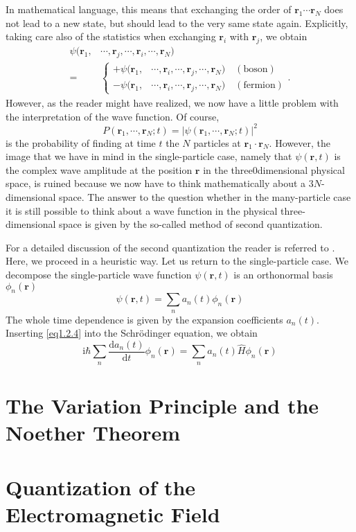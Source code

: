 \documentclass[twoside,11pt]{report}
\def\be{\begin{equation}}
\def\ee{\end{equation}}
\def\ii{\text{i}}
\def\dd{\text{d}}
\begin{document}
In mathematical language, this means that exchanging the order of $\bm r_1\cdots\bm r_N$ does not lead to a new state, but should lead to the very same state again. Explicitly, taking care also of the statistics when exchanging $\bm r_i$ with $\bm r_j$, we obtain
\be\begin{split}
\psi(\bm r_1,&\cdots,\bm r_j,\cdots,\bm r_i,\cdots,\bm r_N)\\
=&\begin{cases}
+\psi(\bm r_1,&\cdots,\bm r_i,\cdots,\bm r_j,\cdots,\bm r_N)\quad  (\text{boson})\\
-\psi(\bm r_1,&\cdots,\bm r_i,\cdots,\bm r_j,\cdots,\bm r_N)\quad  (\text{fermion})
\end{cases}. 
\end{split}\ee
However, as the reader might have realized, we now have a little problem with the interpretation of the wave function. Of course, 
\be
P(\bm r_1,\cdots,\bm r_N;t)=|\psi(\bm r_1,\cdots,\bm r_N;t)|^2
\ee
is the probability of finding at time $t$ the $N$ particles at $\bm r_1\cdot\bm r_N$. However, the image that we have in mind in the single-particle case, namely that $\psi(\bm r,t)$ is the complex wave amplitude at the position $\bm r$ in the three0dimensional physical space, is ruined because we now have to think mathematically about a $3N$-dimensional space. The answer to the question whether in the many-particle case it is still possible to think about a wave function in the physical three-dimensional space is given by the so-called method of second quantization. 

For a detailed discussion of the second quantization the reader is referred to \cite{3}. Here, we proceed in a heuristic way. Let us return to the single-particle case. We decompose the single-particle wave function $\psi(\bm r,t)$ is an orthonormal basis $\phi_n(\bm r)$
\be
\psi(\bm r,t)=\sum_na_n(t)\phi_n(\bm r)
\ee
The whole time dependence is given by the expansion coefficients $a_n(t)$. Inserting \eqref{eq1.2.4} into the Schrödinger equation, we obtain
\be
\ii\hbar\sum_n\frac{\dd a_n(t)}{\dd t}\phi_n(\bm r)=\sum_na_n(t)\hat{H}\phi_n(\bm r)
\ee


\section{The Variation Principle and the Noether Theorem}
\section{Quantization of the Electromagnetic Field}
\end{document}
